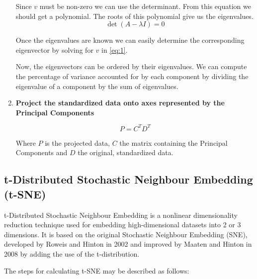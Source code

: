 \documentclass[a4paper, 12pt, twoside]{report}
\begin{document}
\begin{enumerate}
    Since $v$ must be non-zero we can use the determinant. From this equation we should get a polynomial. The roots of this polynomial give us the eigenvalues.
    \[ \det(A - \lambda I) = 0 \]

    Once the eigenvalues are known we can easily determine the corresponding eigenvector by solving for $v$ in \ref{eq:1}.

    Now, the eigenvectors can be ordered by their eigenvalues. We can compute the percentage of variance accounted for by each component by dividing the eigenvalue of a component by the sum of eigenvalues.

\item \textbf{Project the standardized data onto axes represented by the Principal Components}

\[ P = C^{T}D^{T} \]

Where $P$ is the projected data, $C$ the matrix containing the Principal Components and $D$ the original, standardized data.
\end{enumerate}


\subsection{t-Distributed Stochastic Neighbour Embedding (t-SNE)}
\label{sec:orgadaa38f}

t-Distributed Stochastic Neighbour Embedding is a nonlinear dimensionality reduction technique used for embedding high-dimensional datasets into 2 or 3 dimensions. It is based on the original Stochastic Neighbour Embedding (SNE), developed by Roweis and Hinton \cite{sne} in 2002 and improved by Maaten and Hinton \cite{tsne} in 2008 by adding the use of the t-distribution.

The steps for calculating t-SNE may be described as follows:
\end{document}
